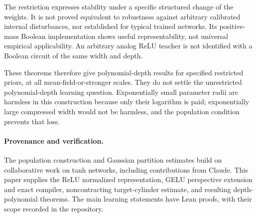 \documentclass[11pt]{article}
\begin{document}
The restriction expresses stability under a specific structured change of the weights. It is not proved equivalent to robustness against arbitrary calibrated internal disturbances, nor established for typical trained networks. Its positive-mass Boolean implementation shows useful representability, not universal empirical applicability. An arbitrary analog ReLU teacher is not identified with a Boolean circuit of the same width and depth.

These theorems therefore give polynomial-depth results for specified restricted priors, at all mean-field-or-stronger scales. They do not settle the unrestricted polynomial-depth learning question. Exponentially small parameter radii are harmless in this construction because only their logarithm is paid; exponentially large compressed width would not be harmless, and the population condition prevents that loss.

\paragraph{Provenance and verification.}
The population construction and Gaussian partition estimates build on collaborative work on tanh networks, including contributions from Claude. This paper supplies the ReLU normalized representation, GELU perspective extension and exact compiler, noncontracting target-cylinder estimate, and resulting depth-polynomial theorems. The main learning statements have Lean proofs, with their scope recorded in the repository.
\end{document}
